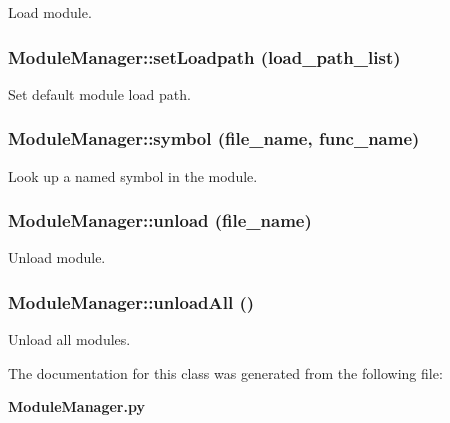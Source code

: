 Load module. 

\subsubsection{\setlength{\rightskip}{0pt plus 5cm}Module\-Manager::set\-Loadpath (load\_\-path\_\-list)}\label{classModuleManager_ModuleManagera14}


Set default module load path. 

\subsubsection{\setlength{\rightskip}{0pt plus 5cm}Module\-Manager::symbol (file\_\-name, func\_\-name)}\label{classModuleManager_ModuleManagera13}


Look up a named symbol in the module. 

\subsubsection{\setlength{\rightskip}{0pt plus 5cm}Module\-Manager::unload (file\_\-name)}\label{classModuleManager_ModuleManagera11}


Unload module. 

\subsubsection{\setlength{\rightskip}{0pt plus 5cm}Module\-Manager::unload\-All ()}\label{classModuleManager_ModuleManagera12}


Unload all modules. 



The documentation for this class was generated from the following file:\begin{CompactItemize}
\item 
{\bf Module\-Manager.py}\end{CompactItemize}
